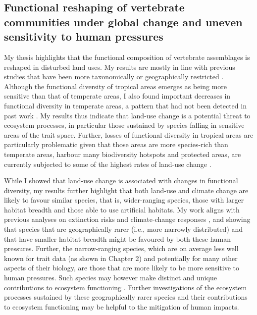 \subsection{Functional reshaping of vertebrate communities under global change and uneven sensitivity to human pressures}
My thesis highlights that the functional composition of vertebrate assemblages is reshaped in disturbed land uses. My results are mostly in line with previous studies that have been more taxonomically or geographically restricted \citep{Flynn2009, Matuoka2020, Marcacci2021}. Although the functional diversity of tropical areas emerges as being more sensitive than that of temperate areas, I also found important decreases in functional diversity in temperate areas, a pattern that had not been detected in past work \citep{Matuoka2020}. My results thus indicate that land-use change is a potential threat to ecosystem processes, in particular those sustained by species falling in sensitive areas of the trait space. Further, losses of functional diversity in tropical areas are particularly problematic given that those areas are more species-rich than temperate areas, harbour many biodiversity hotspots and protected areas, are currently subjected to some of the highest rates of land-use change \citep{Laurance2012, Hansen2013, Spracklen2015}. 

While I showed that land-use change is associated with changes in functional diversity, my results further highlight that both land-use and climate change are likely to favour similar species, that is, wider-ranging species, those with larger habitat breadth and those able to use artificial habitats. My work aligns with previous analyses on extinction risks \citep{Chichorro2019} and climate-change responses \citep{MacLean2017}, and showing that species that are geographically rarer (i.e., more narrowly distributed) and that have smaller habitat breadth might be favoured by both these human pressures. Further, the narrow-ranging species, which are on average less well known for trait data (as shown in Chapter 2) and potentially for many other aspects of their biology, are those that are more likely to be more sensitive to human pressures. Such species may however make distinct and unique contributions to ecosystem functioning \citep{Mouillot2013,Dee2019}. Further investigations of the ecosystem processes sustained by these geographically rarer species and their contributions to ecosystem functioning may be helpful to the mitigation of human impacts. 


